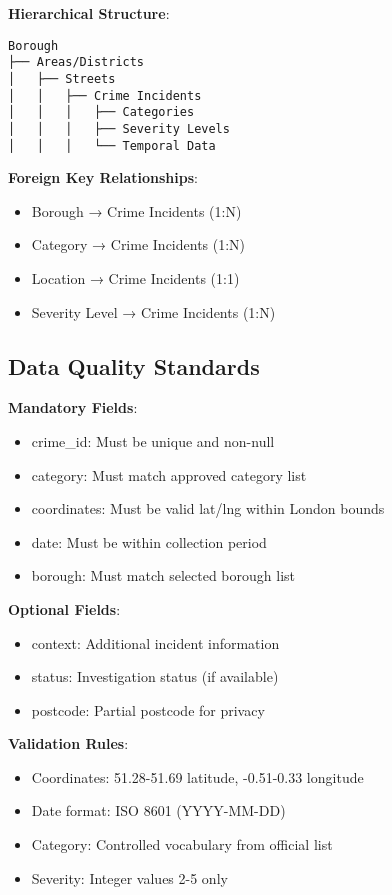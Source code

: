 \documentclass[12pt,a4paper]{article}
\begin{document}
\textbf{Hierarchical Structure}:
\begin{verbatim}
Borough
├── Areas/Districts
│   ├── Streets
│   │   ├── Crime Incidents
│   │   │   ├── Categories
│   │   │   ├── Severity Levels
│   │   │   └── Temporal Data
\end{verbatim}

\textbf{Foreign Key Relationships}:
\begin{itemize}
    \item Borough → Crime Incidents (1:N)
    \item Category → Crime Incidents (1:N)
    \item Location → Crime Incidents (1:1)
    \item Severity Level → Crime Incidents (1:N)
\end{itemize}

\subsection{Data Quality Standards}

\textbf{Mandatory Fields}:
\begin{itemize}
    \item crime\_id: Must be unique and non-null
    \item category: Must match approved category list
    \item coordinates: Must be valid lat/lng within London bounds
    \item date: Must be within collection period
    \item borough: Must match selected borough list
\end{itemize}

\textbf{Optional Fields}:
\begin{itemize}
    \item context: Additional incident information
    \item status: Investigation status (if available)
    \item postcode: Partial postcode for privacy
\end{itemize}

\textbf{Validation Rules}:
\begin{itemize}
    \item Coordinates: 51.28-51.69 latitude, -0.51-0.33 longitude
    \item Date format: ISO 8601 (YYYY-MM-DD)
    \item Category: Controlled vocabulary from official list
    \item Severity: Integer values 2-5 only
\end{itemize}
\end{document}
